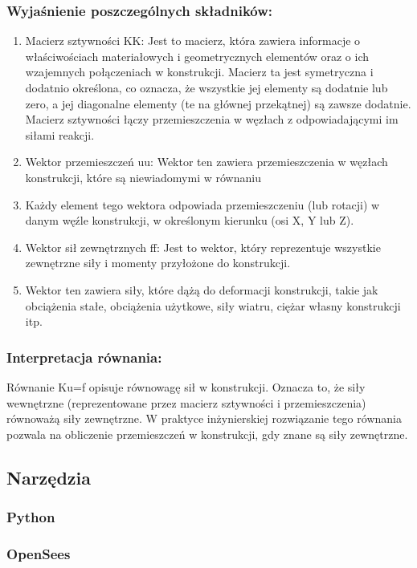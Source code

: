 \subsubsection*{Wyjaśnienie poszczególnych składników:}
\begin{enumerate}
\item Macierz sztywności KK:
Jest to macierz, która zawiera informacje o właściwościach materiałowych i geometrycznych elementów oraz o ich wzajemnych połączeniach w konstrukcji. Macierz ta jest symetryczna i dodatnio określona, co oznacza, że wszystkie jej elementy są dodatnie lub zero, a jej diagonalne elementy (te na głównej przekątnej) są zawsze dodatnie. Macierz sztywności łączy przemieszczenia w węzłach z odpowiadającymi im siłami reakcji.


\item Wektor przemieszczeń uu:
Wektor ten zawiera przemieszczenia w węzłach konstrukcji, które są niewiadomymi w równaniu
\item Każdy element tego wektora odpowiada przemieszczeniu (lub rotacji) w danym węźle konstrukcji, w określonym kierunku (osi X, Y lub Z).


\item Wektor sił zewnętrznych ff:
Jest to wektor, który reprezentuje wszystkie zewnętrzne siły i momenty przyłożone do konstrukcji.
\item Wektor ten zawiera siły, które dążą do deformacji konstrukcji, takie jak obciążenia stałe, obciążenia użytkowe, siły wiatru, ciężar własny konstrukcji itp.


\end{enumerate}

\subsubsection*{Interpretacja równania:}
Równanie Ku=f opisuje równowagę sił w konstrukcji.
Oznacza to, że siły wewnętrzne (reprezentowane przez macierz sztywności i przemieszczenia) równoważą siły zewnętrzne.
W praktyce inżynierskiej rozwiązanie tego równania pozwala na obliczenie przemieszczeń w konstrukcji, gdy znane są siły zewnętrzne.

\subsection{Narzędzia}
\subsubsection{Python}
\subsubsection{OpenSees}
